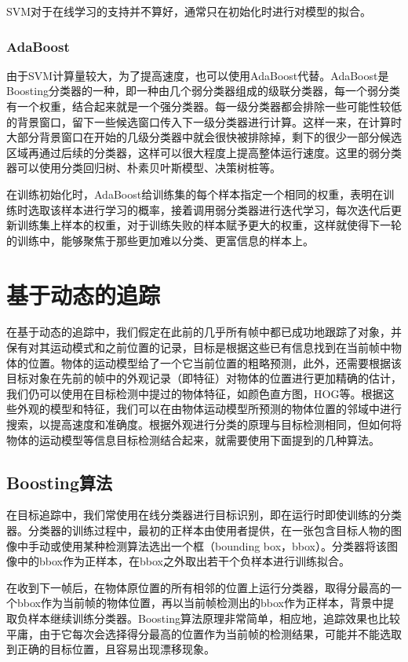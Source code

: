   SVM对于在线学习的支持并不算好，通常只在初始化时进行对模型的拟合。

\subsubsection{AdaBoost}

  由于SVM计算量较大，为了提高速度，也可以使用AdaBoost代替。AdaBoost是Boosting分类器的一种，即一种由几个弱分类器组成的级联分类器，每一个弱分类有一个权重，结合起来就是一个强分类器。每一级分类器都会排除一些可能性较低的背景窗口，留下一些候选窗口传入下一级分类器进行计算。这样一来，在计算时大部分背景窗口在开始的几级分类器中就会很快被排除掉，剩下的很少一部分候选区域再通过后续的分类器，这样可以很大程度上提高整体运行速度。这里的弱分类器可以使用分类回归树、朴素贝叶斯模型、决策树桩等。

  在训练初始化时，AdaBoost给训练集的每个样本指定一个相同的权重，表明在训练时选取该样本进行学习的概率，接着调用弱分类器进行迭代学习，每次迭代后更新训练集上样本的权重，对于训练失败的样本赋予更大的权重，这样就使得下一轮的训练中，能够聚焦于那些更加难以分类、更富信息的样本上。


\section{基于动态的追踪}

  在基于动态的追踪中，我们假定在此前的几乎所有帧中都已成功地跟踪了对象，并保有对其运动模式和之前位置的记录，目标是根据这些已有信息找到在当前帧中物体的位置。物体的运动模型给了一个它当前位置的粗略预测，此外，还需要根据该目标对象在先前的帧中的外观记录（即特征）对物体的位置进行更加精确的估计，我们仍可以使用在目标检测中提过的物体特征，如颜色直方图，HOG等。根据这些外观的模型和特征，我们可以在由物体运动模型所预测的物体位置的邻域中进行搜索，以提高速度和准确度。根据外观进行分类的原理与目标检测相同，但如何将物体的运动模型等信息目标检测结合起来，就需要使用下面提到的几种算法。

\subsection{Boosting算法}
  在目标追踪中，我们常使用在线分类器进行目标识别，即在运行时即使训练的分类器。分类器的训练过程中，最初的正样本由使用者提供，在一张包含目标人物的图像中手动或使用某种检测算法选出一个框（bounding box，bbox）。分类器将该图像中的bbox作为正样本，在bbox之外取出若干个负样本进行训练拟合。

  在收到下一帧后，在物体原位置的所有相邻的位置上运行分类器，取得分最高的一个bbox作为当前帧的物体位置，再以当前帧检测出的bbox作为正样本，背景中提取负样本继续训练分类器。Boosting算法原理非常简单，相应地，追踪效果也比较平庸，由于它每次会选择得分最高的位置作为当前帧的检测结果，可能并不能选取到正确的目标位置，且容易出现漂移现象。

